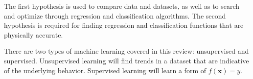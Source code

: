 The first hypothesis is used to compare data and datasets, as well as to search and optimize through regression and classification algorithms. The second hypothesis is required for finding regression and classification functions that are physically accurate.

There are two types of machine learning covered in this review: unsupervised and supervised. Unsupervised learning will find trends in a dataset that are indicative of the underlying behavior. Supervised learning will learn a form of $f(\mathbf{x}) = y$. 



